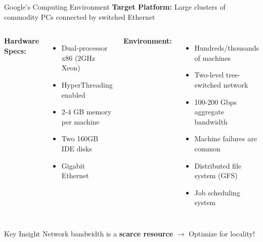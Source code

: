 \documentclass[aspectratio=169]{beamer}
\begin{document}
\begin{frame}{Google's Computing Environment}
\textbf{Target Platform:} Large clusters of commodity PCs connected by switched Ethernet

\vspace{0.3cm}

\begin{columns}
\textbf{Hardware Specs:}
\begin{itemize}
    \item Dual-processor x86 (2GHz Xeon)
    \item HyperThreading enabled
    \item 2-4 GB memory per machine
    \item Two 160GB IDE disks
    \item Gigabit Ethernet
\end{itemize}

\textbf{Environment:}
\begin{itemize}
    \item Hundreds/thousands of machines
    \item Two-level tree-switched network
    \item 100-200 Gbps aggregate bandwidth
    \item Machine failures are \alert{common}
    \item Distributed file system (GFS)
    \item Job scheduling system
\end{itemize}
\end{columns}

\vspace{0.5cm}

\begin{alertblock}{Key Insight}
Network bandwidth is a \textbf{scarce resource} $\rightarrow$ Optimize for locality!
\end{alertblock}
\end{frame}
\end{document}
